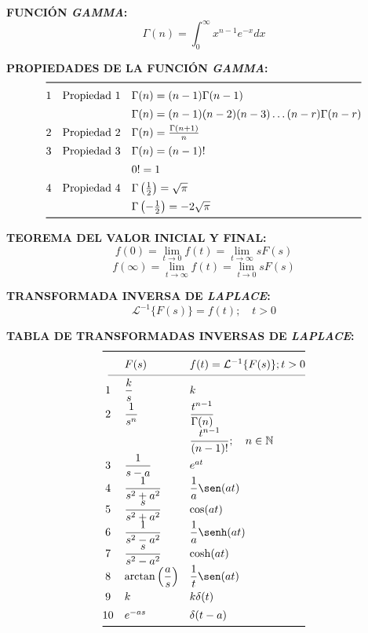 \documentclass[letter,twoside,8pt]{article}
\begin{document}
\textbf{FUNCIÓN \emph{GAMMA}:}
\begin{equation*}
    \Gamma(n)=\int_0^{\infty}x^{n-1}e^{-x}{dx}
\end{equation*}

\textbf{PROPIEDADES DE LA FUNCIÓN \emph{GAMMA}:}
\begin{equation*}
\def\arraystretch{1.4}
\begin{array}{@{}cll@{}}
\toprule
 1 & \text{Propiedad 1}
   & \Gamma(n)=(n-1)\Gamma(n-1)\\
   &
   & \Gamma(n)=(n-1)(n-2)(n-3)\dots(n-r)\Gamma(n-r)\\
 2 & \text{Propiedad 2}
   & \Gamma(n)=\frac{\Gamma(n+1)}{n}\\
 3 & \text{Propiedad 3}
   & \Gamma(n)=(n-1)!\\
   &
   & 0!=1\\
 4 & \text{Propiedad 4}
   & \Gamma\left(\frac{1}{2}\right)=\sqrt{\pi}\\
   &
   & \Gamma\left(-\frac{1}{2}\right)=-2\sqrt{\pi}\\
\bottomrule
\end{array}
\end{equation*}

\textbf{TEOREMA DEL VALOR INICIAL Y FINAL:}
\begin{equation*}
    f(0)=\lim_{t\rightarrow{0}}f(t)=\lim_{t\rightarrow\infty}sF(s)
\end{equation*}
\begin{equation*}
    f(\infty)=\lim_{t\rightarrow\infty}f(t)=\lim_{t\rightarrow{0}}sF(s)
\end{equation*}

\textbf{TRANSFORMADA INVERSA DE \emph{LAPLACE}:}
\begin{equation*}
    \mathcal{L}^{-1}\{F(s)\}=f(t);\quad{t}>0
\end{equation*}

\textbf{TABLA DE TRANSFORMADAS INVERSAS DE \emph{LAPLACE}:}
\begin{equation*}
\def\arraystretch{1.4}
\begin{array}{@{}cll@{}}
\toprule
 & F(s) & f(t)=\mathcal{L}^{-1}\{F(s)\};t>0\\
\cmidrule(l){1-3}
 1 & \dfrac{k}{s}
   & k\\
 2 & \dfrac{1}{s^n}
   & \dfrac{t^{n-1}}{\Gamma(n)}\\
   &
   & \dfrac{t^{n-1}}{(n-1)!};\quad{n}\in\mathbb{N}\\
 3 & \dfrac{1}{s-a}
   & e^{at}\\
 4 & \dfrac{1}{s^2+a^2}
   & \dfrac{1}{a}\sen(at)\\
 5 & \dfrac{s}{s^2+a^2}
   & \cos(at)\\
 6 & \dfrac{1}{s^2-a^2}
   & \dfrac{1}{a}\senh(at)\\
 7 & \dfrac{s}{s^2-a^2}
   & \cosh(at)\\
 8 & \arctan\left(\dfrac{a}{s}\right)
   & \dfrac{1}{t}\sen(at)\\
 9 & k
   & k\delta(t)\\
10 & e^{-as}
   & \delta(t-a)\\
\bottomrule
\end{array}
\end{equation*}
\end{document}
